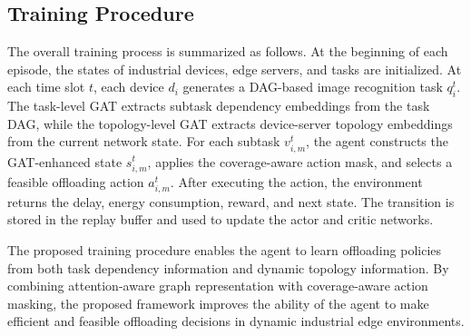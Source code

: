 \documentclass[conference]{IEEEtran}
\begin{document}
\subsection{Training Procedure}

The overall training process is summarized as follows. At the beginning of each episode, the states of industrial devices, edge servers, and tasks are initialized. At each time slot $t$, each device $d_i$ generates a DAG-based image recognition task $q_i^t$. The task-level GAT extracts subtask dependency embeddings from the task DAG, while the topology-level GAT extracts device-server topology embeddings from the current network state. For each subtask $v_{i,m}^t$, the agent constructs the GAT-enhanced state $s_{i,m}^t$, applies the coverage-aware action mask, and selects a feasible offloading action $a_{i,m}^t$. After executing the action, the environment returns the delay, energy consumption, reward, and next state. The transition is stored in the replay buffer and used to update the actor and critic networks.

The proposed training procedure enables the agent to learn offloading policies from both task dependency information and dynamic topology information. By combining attention-aware graph representation with coverage-aware action masking, the proposed framework improves the ability of the agent to make efficient and feasible offloading decisions in dynamic industrial edge environments.




\end{document}
